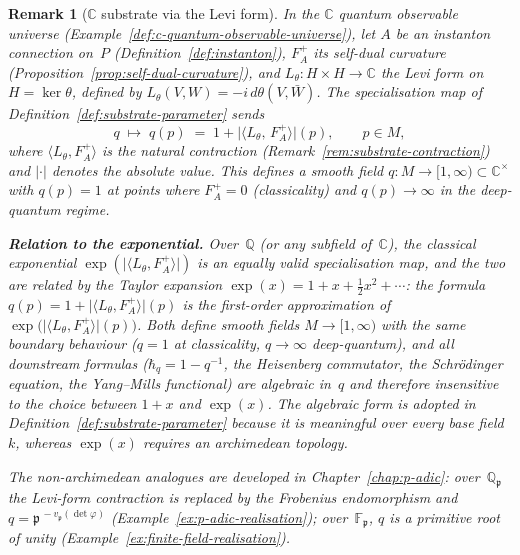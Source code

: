 \documentclass[12pt,a4paper]{report}
\newtheorem{remark}[theorem]{Remark}
\newcommand{\pp}{\mathfrak{p}}
\begin{document}
\begin{remark}[$\mathbb{C}$ substrate via the Levi form]
\label{rem:c-substrate-via-levi}
In the $\mathbb{C}$ quantum observable universe
(Example~\ref{def:c-quantum-observable-universe}), let $A$ be an
instanton connection on~$P$
(Definition~\ref{def:instanton}), $F_A^+$ its self-dual curvature
(Proposition~\ref{prop:self-dual-curvature}), and
$L_\theta \colon H \times H \to \mathbb{C}$ the Levi form on
$H = \ker\theta$, defined by
$L_\theta(V, W) = -i\,d\theta(V, \bar{W})$.
The specialisation map of
Definition~\ref{def:substrate-parameter} sends
\[
  q \;\longmapsto\;
  q(p) \;=\; 1 + \lvert\langle L_\theta,\, F_A^+ \rangle\rvert(p),
  \qquad p \in M,
\]
where $\langle L_\theta, F_A^+\rangle$ is the natural contraction
(Remark~\ref{rem:substrate-contraction}) and $\lvert\cdot\rvert$ denotes
the absolute value.  This defines a smooth field
$q \colon M \to [1,\infty) \subset \mathbb{C}^{\times}$ with $q(p) = 1$
at points where $F_A^+ = 0$ (classicality) and $q(p) \to \infty$ in the
deep-quantum regime.

\textbf{Relation to the exponential.}
Over~$\mathbb{Q}$ (or any subfield of~$\mathbb{C}$), the classical
exponential $\exp(\lvert\langle L_\theta, F_A^+\rangle\rvert)$ is an
equally valid specialisation map, and the two are related by the Taylor
expansion $\exp(x) = 1 + x + \tfrac{1}{2}x^2 + \cdots$:
the formula $q(p) = 1 + \lvert\langle L_\theta, F_A^+\rangle\rvert(p)$
is the first-order approximation of
$\exp\!\bigl(\lvert\langle L_\theta, F_A^+\rangle\rvert(p)\bigr)$.
Both define smooth fields $M \to [1,\infty)$ with
the same boundary behaviour ($q = 1$ at classicality, $q \to \infty$
deep-quantum), and all downstream formulas
($\hbar_q = 1 - q^{-1}$, the Heisenberg commutator, the Schrödinger
equation, the Yang--Mills functional) are algebraic in~$q$ and therefore
insensitive to the choice between $1+x$ and $\exp(x)$.  The algebraic
form is adopted in Definition~\ref{def:substrate-parameter} because it
is meaningful over every base field~$k$, whereas $\exp(x)$ requires an
archimedean topology.

The non-archimedean analogues are developed in
Chapter~\ref{chap:p-adic}: over~$\mathbb{Q}_\pp$ the Levi-form
contraction is replaced by the Frobenius endomorphism and
$q = \pp^{\,-v_\pp(\det\varphi)}$
(Example~\ref{ex:p-adic-realisation}); over~$\mathbb{F}_\pp$, $q$
is a primitive root of unity
(Example~\ref{ex:finite-field-realisation}).
\end{remark}
\end{document}
